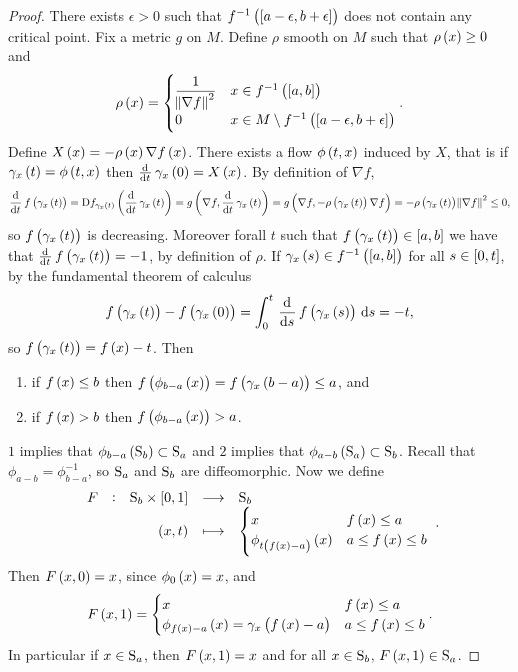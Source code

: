 \begin{proof}
There exists $ \epsilon > 0 $ such that $ f^{-1}\br{\sbr{a - \epsilon, b + \epsilon}} $ does not contain any critical point. Fix a metric $ g $ on $ M $. Define $ \rho $ smooth on $ M $ such that $ \rho\br{x} \ge 0 $ and
$$ \rho\br{x} =
\begin{cases}
\dfrac{1}{\norm{\nabla f}^2} & x \in f^{-1}\br{\sbr{a, b}} \\
0 & x \in M \setminus f^{-1}\br{\sbr{a - \epsilon, b + \epsilon}}
\end{cases}.
$$
Define $ X\br{x} = -\rho\br{x}\nabla f\br{x} $. There exists a flow $ \phi\br{t, x} $ induced by $ X $, that is if $ \gamma_x\br{t} = \phi\br{t, x} $ then $ \tod{}{t}\gamma_x\br{0} = X\br{x} $. By definition of $ \nabla f $,
$$ \dod{}{t}f\br{\gamma_x\br{t}} = \D f_{\gamma_x\br{t}}\br{\dod{}{t}\gamma_x\br{t}} = g\br{\nabla f, \dod{}{t}\gamma_x\br{t}} = g\br{\nabla f, -\rho\br{\gamma_x\br{t}}\nabla f} = -\rho\br{\gamma_x\br{t}}\norm{\nabla f}^2 \le 0, $$
so $ f\br{\gamma_x\br{t}} $ is decreasing. Moreover forall $ t $ such that $ f\br{\gamma_x\br{t}} \in \sbr{a, b} $ we have that $ \tod{}{t}f\br{\gamma_x\br{t}} = -1 $, by definition of $ \rho $. If $ \gamma_x\br{s} \in f^{-1}\br{\sbr{a, b}} $ for all $ s \in \sbr{0, t} $, by the fundamental theorem of calculus
$$ f\br{\gamma_x\br{t}} - f\br{\gamma_x\br{0}} = \intd{0}{t}{\dod{}{s}f\br{\gamma_x\br{s}}}{s} = -t, $$
so $ f\br{\gamma_x\br{t}} = f\br{x} - t $. Then
\begin{enumerate}
\item if $ f\br{x} \le b $ then $ f\br{\phi_{b - a}\br{x}} = f\br{\gamma_x\br{b - a}} \le a $, and
\item if $ f\br{x} > b $ then $ f\br{\phi_{b - a}\br{x}} > a $.
\end{enumerate}
$ 1 $ implies that $ \phi_{b - a}\br{\S_b} \subset \S_a $ and $ 2 $ implies that $ \phi_{a - b}\br{\S_a} \subset \S_b $. Recall that $ \phi_{a - b} = \phi_{b - a}^{-1} $, so $ \S_a $ and $ \S_b $ are diffeomorphic. Now we define
$$ \function[F]{\S_b \times \sbr{0, 1}}{\S_b}{\br{x, t}}{
\begin{cases}
x & f\br{x} \le a \\
\phi_{t\br{f\br{x} - a}}\br{x} & a \le f\br{x} \le b
\end{cases}
}. $$
Then $ F\br{x, 0} = x $, since $ \phi_0\br{x} = x $, and
$$ F\br{x, 1} =
\begin{cases}
x & f\br{x} \le a \\
\phi_{f\br{x} - a}\br{x} = \gamma_x\br{f\br{x} - a} & a \le f\br{x} \le b
\end{cases}.
$$
In particular if $ x \in \S_a $, then $ F\br{x, 1} = x $ and for all $ x \in \S_b $, $ F\br{x, 1} \in \S_a $.
\end{proof}

